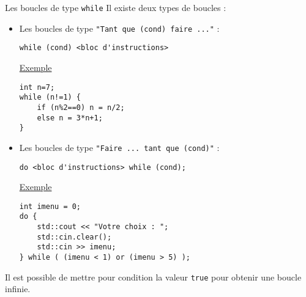 \documentclass[compress,10pt,aspectratio=169]{beamer}
\begin{document}
\begin{frame}[fragile]{Les boucles de type \texttt{while}}
    \scriptsize
    Il existe deux types de boucles :
    \begin{multicols}{2}
    \begin{itemize}
        \item Les boucles de type \texttt{"Tant que (cond) faire ..."} :
        \begin{verbatim}
while (cond) <bloc d'instructions> 
        \end{verbatim}
        \underline{Exemple}
        \begin{verbatim}
int n=7;
while (n!=1) {
    if (n%2==0) n = n/2;
    else n = 3*n+1;
}
\end{verbatim}
        \columnbreak
        \item Les boucles de type \texttt{"Faire ... tant que (cond)"} :
        \begin{verbatim}
do <bloc d'instructions> while (cond);
        \end{verbatim}
        \underline{Exemple}
\begin{verbatim}
int imenu = 0;
do {
    std::cout << "Votre choix : ";
    std::cin.clear();
    std::cin >> imenu;
} while ( (imenu < 1) or (imenu > 5) );
\end{verbatim}
\end{itemize}
\end{multicols}

Il est possible de mettre pour condition la valeur \texttt{true} pour obtenir une boucle infinie.
\end{frame}
\end{document}

